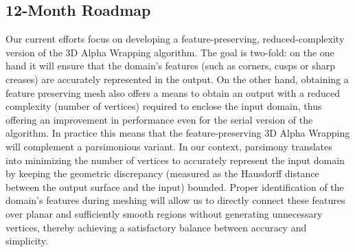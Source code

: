 \subsection{12-Month Roadmap}
\label{sec:WP1:CGAL:roadmap}




Our current efforts focus on developing a feature-preserving, reduced-complexity version of the 3D Alpha Wrapping algorithm.
The goal is two-fold: on the one hand it will ensure that the domain's features (such as corners, cusps or sharp creases) are accurately represented in the output. On the other hand, obtaining a feature preserving mesh also offers a means to obtain an output with a reduced complexity (number of vertices) required to enclose the input domain, thus offering an improvement in performance even for the serial version of the algorithm. 
In practice this means that the feature-preserving 3D Alpha Wrapping will complement a parsimonious variant.
In our context, parsimony translates into minimizing the number of vertices to accurately represent the input domain by keeping 
the geometric discrepancy (measured as the Hausdorff distance between the output surface and the input) bounded.
Proper identification of the domain's features during meshing will allow us to directly connect these features over planar and sufficiently 
smooth regions without generating unnecessary vertices, thereby achieving a satisfactory balance between accuracy and simplicity.


